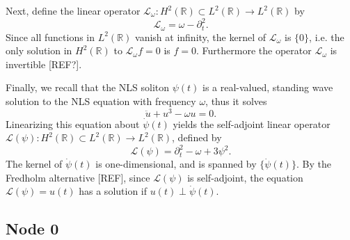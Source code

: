 \documentclass[11pt,reqno]{amsart}
\def\R{{\mathbb R}}
\def\calL{{\mathcal L}}
\def\Lw{{\mathcal{L}_\omega}}
\begin{document}
Next, define the linear operator $\Lw: H^2(\R) \subset L^2(\R) \rightarrow L^2(\R)$ by
\begin{equation}\label{eq:Lw}
\Lw = \omega - \partial_t^2.
\end{equation}
Since all functions in $L^2(\R)$ vanish at infinity, the kernel of $\Lw$ is $\{0\}$, i.e. the only solution in $H^2(\R)$ to $\Lw f = 0$ is $f = 0$. Furthermore the operator $\Lw$ is invertible [REF?].

Finally, we recall that the NLS soliton $\psi(t)$ is a real-valued, standing wave solution to the NLS equation with frequency $\omega$, thus it solves 
\begin{equation}\label{eq:NLSreal}
\ddot{u} + u^3 - \omega u = 0. 
\end{equation}
Linearizing this equation about $\dot{\psi}(t)$ yields the self-adjoint linear operator $\calL(\psi): H^2(\R) \subset L^2(\R) \rightarrow L^2(\R)$, defined by
\begin{equation}\label{eq:Lpsi}
\calL(\psi) = \partial_t^2 - \omega + 3 \psi^2.
\end{equation}
The kernel of $\dot{\psi}(t)$ is one-dimensional, and is spanned by $\{ \dot{\psi}(t) \}$. By the Fredholm alternative [REF], since $\calL(\psi)$ is self-adjoint, the equation $\calL(\psi) = u(t)$ has a solution if $u(t) \perp \dot{\psi}(t)$.

\subsection{Node 0}
\end{document}
